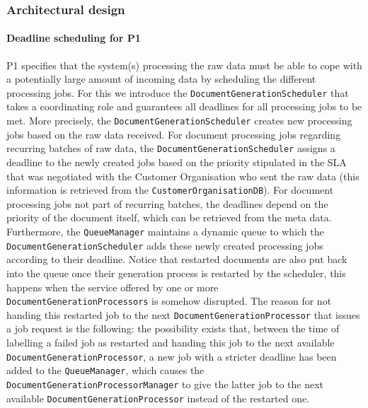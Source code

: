 \documentclass[a4paper,10pt]{article}
\begin{document}
\subsubsection{Architectural design}
\paragraph{Deadline scheduling for P1}
P1 specifies that the system(s) processing the raw data must be able to cope with a potentially large amount of incoming data by scheduling the different processing jobs. For this we introduce the \texttt{DocumentGenerationScheduler} that takes a coordinating role and guarantees all deadlines for all processing jobs to be met. More precisely, the \texttt{DocumentGenerationScheduler} creates new processing jobs based on the raw data received. For document processing jobs regarding recurring batches of raw data, the \texttt{DocumentGenerationScheduler} assigns a deadline to the newly created jobs based on the priority stipulated in the SLA that was negotiated with the Customer Organisation who sent the raw data (this information is retrieved from the \texttt{CustomerOrganisationDB}). For document processing jobs not part of recurring batches, the deadlines depend on the priority of the document itself, which can be retrieved from the meta data. Furthermore, the \texttt{QueueManager} maintains a dynamic queue to which the \texttt{DocumentGenerationScheduler} adds these newly created processing jobs according to their deadline. Notice that restarted documents are also put back into the queue once their generation process is restarted by the scheduler, this happens when the service offered by one or more \texttt{DocumentGenerationProcessors} is somehow disrupted. The reason for not handing this restarted job to the next \texttt{DocumentGenerationProcessor} that issues a job request is the following: the possibility exists that, between the time of labelling a failed job as restarted and handing this job to the next available \texttt{DocumentGenerationProcessor}, a new job with a stricter deadline has been added to the \texttt{QueueManager}, which causes the \texttt{DocumentGenerationProcessorManager} to give the latter job to the next available \texttt{DocumentGenerationProcessor} instead of the restarted one.
\end{document}
